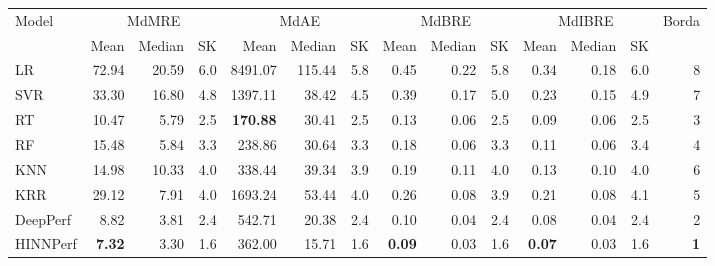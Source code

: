 \begin{tabular}{lrrrrrrrrrrrrr}
\toprule
Model & \multicolumn{3}{c}{MdMRE} & \multicolumn{3}{c}{MdAE} & \multicolumn{3}{c}{MdBRE} & \multicolumn{3}{c}{MdIBRE} & Borda \\
 & Mean & Median & SK & Mean & Median & SK & Mean & Median & SK & Mean & Median & SK &  \\
\midrule
LR & 72.94 & 20.59 & 6.0 & 8491.07 & 115.44 & 5.8 & 0.45 & 0.22 & 5.8 & 0.34 & 0.18 & 6.0 & 8 \\
SVR & 33.30 & 16.80 & 4.8 & 1397.11 & 38.42 & 4.5 & 0.39 & 0.17 & 5.0 & 0.23 & 0.15 & 4.9 & 7 \\
RT & 10.47 & 5.79 & 2.5 & \textbf{170.88} & 30.41 & 2.5 & 0.13 & 0.06 & 2.5 & 0.09 & 0.06 & 2.5 & 3 \\
RF & 15.48 & 5.84 & 3.3 & 238.86 & 30.64 & 3.3 & 0.18 & 0.06 & 3.3 & 0.11 & 0.06 & 3.4 & 4 \\
KNN & 14.98 & 10.33 & 4.0 & 338.44 & 39.34 & 3.9 & 0.19 & 0.11 & 4.0 & 0.13 & 0.10 & 4.0 & 6 \\
KRR & 29.12 & 7.91 & 4.0 & 1693.24 & 53.44 & 4.0 & 0.26 & 0.08 & 3.9 & 0.21 & 0.08 & 4.1 & 5 \\
DeepPerf & 8.82 & 3.81 & 2.4 & 542.71 & 20.38 & 2.4 & 0.10 & 0.04 & 2.4 & 0.08 & 0.04 & 2.4 & 2 \\
HINNPerf & \textbf{7.32} & 3.30 & 1.6 & 362.00 & 15.71 & 1.6 & \textbf{0.09} & 0.03 & 1.6 & \textbf{0.07} & 0.03 & 1.6 & \textbf{1} \\
\bottomrule
\end{tabular}
